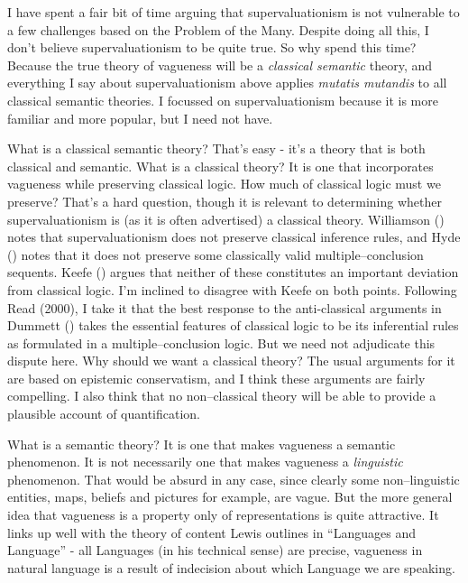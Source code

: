 \documentclass[
  11pt,
  letterpaper,
  DIV=11,
  numbers=noendperiod,
  oneside]{scrartcl}
\begin{document}
I have spent a fair bit of time arguing that supervaluationism is not
vulnerable to a few challenges based on the Problem of the Many. Despite
doing all this, I don't believe supervaluationism to be quite true. So
why spend this time? Because the true theory of vagueness will be a
\emph{classical semantic} theory, and everything I say about
supervaluationism above applies \emph{mutatis mutandis} to all classical
semantic theories. I focussed on supervaluationism because it is more
familiar and more popular, but I need not have.

What is a classical semantic theory? That's easy - it's a theory that is
both classical and semantic. What is a classical theory? It is one that
incorporates vagueness while preserving classical logic. How much of
classical logic must we preserve? That's a hard question, though it is
relevant to determining whether supervaluationism is (as it is often
advertised) a classical theory. Williamson
() notes that supervaluationism
does not preserve classical inference rules, and Hyde
() notes that it does not preserve some
classically valid multiple--conclusion sequents. Keefe
() argues that neither of these
constitutes an important deviation from classical logic. I'm inclined to
disagree with Keefe on both points. Following Read (2000), I take it
that the best response to the anti-classical arguments in Dummett
() takes the essential features of
classical logic to be its inferential rules as formulated in a
multiple--conclusion logic. But we need not adjudicate this dispute
here. Why should we want a classical theory? The usual arguments for it
are based on epistemic conservatism, and I think these arguments are
fairly compelling. I also think that no non--classical theory will be
able to provide a plausible account of quantification.

What is a semantic theory? It is one that makes vagueness a semantic
phenomenon. It is not necessarily one that makes vagueness a
\emph{linguistic} phenomenon. That would be absurd in any case, since
clearly some non--linguistic entities, maps, beliefs and pictures for
example, are vague. But the more general idea that vagueness is a
property only of representations is quite attractive. It links up well
with the theory of content Lewis outlines in ``Languages and Language''
- all Languages (in his technical sense) are precise, vagueness in
natural language is a result of indecision about which Language we are
speaking.
\end{document}
